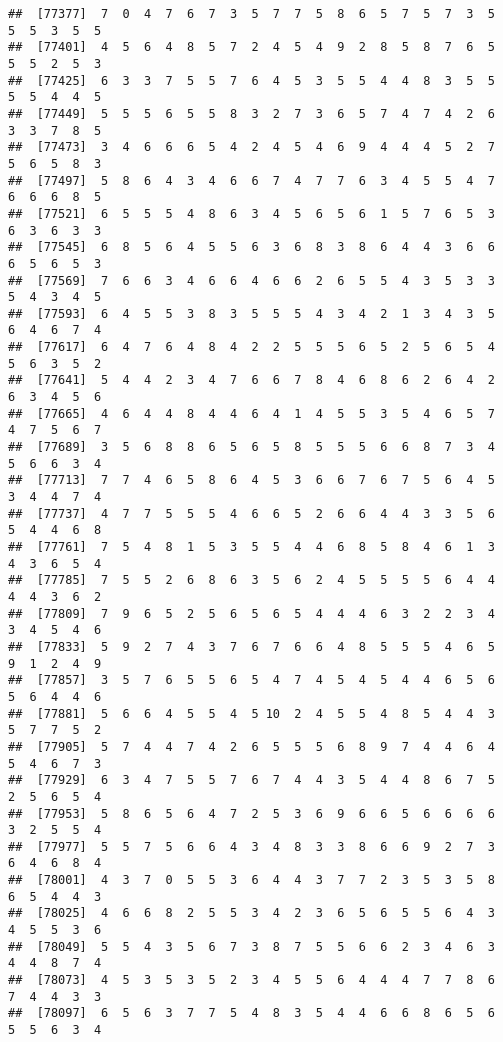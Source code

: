 \documentclass[
]{book}
\begin{document}
\begin{verbatim}
##  [77377]  7  0  4  7  6  7  3  5  7  7  5  8  6  5  7  5  7  3  5  5  5  3  5  5
##  [77401]  4  5  6  4  8  5  7  2  4  5  4  9  2  8  5  8  7  6  5  5  5  2  5  3
##  [77425]  6  3  3  7  5  5  7  6  4  5  3  5  5  4  4  8  3  5  5  5  5  4  4  5
##  [77449]  5  5  5  6  5  5  8  3  2  7  3  6  5  7  4  7  4  2  6  3  3  7  8  5
##  [77473]  3  4  6  6  6  5  4  2  4  5  4  6  9  4  4  4  5  2  7  5  6  5  8  3
##  [77497]  5  8  6  4  3  4  6  6  7  4  7  7  6  3  4  5  5  4  7  6  6  6  8  5
##  [77521]  6  5  5  5  4  8  6  3  4  5  6  5  6  1  5  7  6  5  3  6  3  6  3  3
##  [77545]  6  8  5  6  4  5  5  6  3  6  8  3  8  6  4  4  3  6  6  6  5  6  5  3
##  [77569]  7  6  6  3  4  6  6  4  6  6  2  6  5  5  4  3  5  3  3  5  4  3  4  5
##  [77593]  6  4  5  5  3  8  3  5  5  5  4  3  4  2  1  3  4  3  5  6  4  6  7  4
##  [77617]  6  4  7  6  4  8  4  2  2  5  5  5  6  5  2  5  6  5  4  5  6  3  5  2
##  [77641]  5  4  4  2  3  4  7  6  6  7  8  4  6  8  6  2  6  4  2  6  3  4  5  6
##  [77665]  4  6  4  4  8  4  4  6  4  1  4  5  5  3  5  4  6  5  7  4  7  5  6  7
##  [77689]  3  5  6  8  8  6  5  6  5  8  5  5  5  6  6  8  7  3  4  5  6  6  3  4
##  [77713]  7  7  4  6  5  8  6  4  5  3  6  6  7  6  7  5  6  4  5  3  4  4  7  4
##  [77737]  4  7  7  5  5  5  4  6  6  5  2  6  6  4  4  3  3  5  6  5  4  4  6  8
##  [77761]  7  5  4  8  1  5  3  5  5  4  4  6  8  5  8  4  6  1  3  4  3  6  5  4
##  [77785]  7  5  5  2  6  8  6  3  5  6  2  4  5  5  5  5  6  4  4  4  4  3  6  2
##  [77809]  7  9  6  5  2  5  6  5  6  5  4  4  4  6  3  2  2  3  4  3  4  5  4  6
##  [77833]  5  9  2  7  4  3  7  6  7  6  6  4  8  5  5  5  4  6  5  9  1  2  4  9
##  [77857]  3  5  7  6  5  5  6  5  4  7  4  5  4  5  4  4  6  5  6  5  6  4  4  6
##  [77881]  5  6  6  4  5  5  4  5 10  2  4  5  5  4  8  5  4  4  3  5  7  7  5  2
##  [77905]  5  7  4  4  7  4  2  6  5  5  5  6  8  9  7  4  4  6  4  5  4  6  7  3
##  [77929]  6  3  4  7  5  5  7  6  7  4  4  3  5  4  4  8  6  7  5  2  5  6  5  4
##  [77953]  5  8  6  5  6  4  7  2  5  3  6  9  6  6  5  6  6  6  6  3  2  5  5  4
##  [77977]  5  5  7  5  6  6  4  3  4  8  3  3  8  6  6  9  2  7  3  6  4  6  8  4
##  [78001]  4  3  7  0  5  5  3  6  4  4  3  7  7  2  3  5  3  5  8  6  5  4  4  3
##  [78025]  4  6  6  8  2  5  5  3  4  2  3  6  5  6  5  5  6  4  3  4  5  5  3  6
##  [78049]  5  5  4  3  5  6  7  3  8  7  5  5  6  6  2  3  4  6  3  4  4  8  7  4
##  [78073]  4  5  3  5  3  5  2  3  4  5  5  6  4  4  4  7  7  8  6  7  4  4  3  3
##  [78097]  6  5  6  3  7  7  5  4  8  3  5  4  4  6  6  8  6  5  6  5  5  6  3  4

\end{verbatim}
\end{document}
